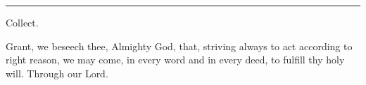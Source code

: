 \documentclass[letterpaper,12pt]{article} %
\begin{document}
\hrule
\begin{center}{\Large Collect.}\end{center}
{Grant, we beseech thee, Almighty God, that, striving always to act according to right reason, we may come, in every word and in every deed, to fulfill thy holy will. Through our Lord.}
\end{document}

